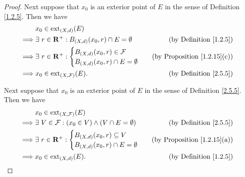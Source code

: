 \begin{proof}
    Next suppose that \(x_0\) is an exterior point of \(E\) in the sense of Definition \ref{1.2.5}.
    Then we have
    \begin{align*}
                 & x_0 \in \text{ext}_{(X, d)}(E)                                                                              \\
        \implies & \exists\ r \in \mathbf{R}^+ : B_{(X, d)}(x_0, r) \cap E = \emptyset & \text{(by Definition \ref{1.2.5})}    \\
        \implies & \exists\ r \in \mathbf{R}^+ : \begin{cases}
                                                     B_{(X, d)}(x_0, r) \in \mathcal{F} \\
                                                     B_{(X, d)}(x_0, r) \cap E = \emptyset
                                                 \end{cases}                         & \text{(by Proposition \ref{1.2.15}(c))} \\
        \implies & x_0 \in \text{ext}_{(X, \mathcal{F})}(E).                           & \text{(by Definition \ref{2.5.5})}
    \end{align*}

    Next suppose that \(x_0\) is an exterior point of \(E\) in the sense of Definition \ref{2.5.5}.
    Then we have
    \begin{align*}
                 & x_0 \in \text{ext}_{(X, \mathcal{F})}(E)                                                                      \\
        \implies & \exists\ V \in \mathcal{F} : (x_0 \in V) \land (V \cap E = \emptyset) & \text{(by Definition \ref{2.5.5})}    \\
        \implies & \exists\ r \in \mathbf{R}^+ : \begin{cases}
                                                     B_{(X, d)}(x_0, r) \subseteq V \\
                                                     B_{(X, d)}(x_0, r) \cap E = \emptyset
                                                 \end{cases}                           & \text{(by Proposition \ref{1.2.15}(a))} \\
        \implies & x_0 \in \text{ext}_{(X, d)}(E).                                       & \text{(by Definition \ref{1.2.5})}
    \end{align*}


\end{proof}
